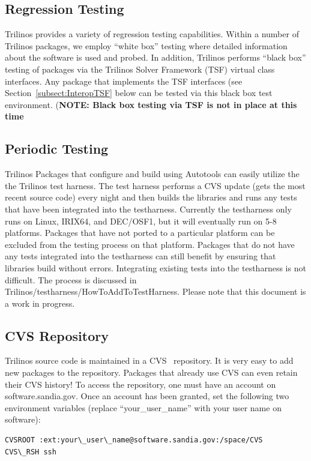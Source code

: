 \documentclass[12pt,relax]{TrilinosDevGuide}
\begin{document}
\subsection{Regression Testing}
Trilinos provides a variety of regression
testing capabilities.  Within a number of Trilinos packages, we employ
``white box'' testing where detailed information about the software is
used and probed.  In addition, Trilinos performs ``black box'' testing
of packages via the Trilinos Solver Framework (TSF) virtual class
interfaces.  Any package that implements the TSF interfaces (see
Section~\ref{subsect:InteropTSF} below 
can be tested via this black box
test environment.  ({\bf NOTE: Black box testing via TSF is not in
place at this time}
	\subsection{Periodic Testing}
Trilinos Packages that configure and build using Autotools can easily 
utilize the the Trilinos test harness.  The test harness performs a CVS update
(gets the most recent source code) every night and then builds the libraries
and runs any tests that have been integrated into the testharness.  
Currently the testharness only runs on Linux, IRIX64, and DEC/OSF1, but it 
will eventually run on 5-8 platforms.  Packages that have not ported to a 
particular platform can be excluded from the testing process on that 
platform.  Packages that do not have any tests integrated into the 
testharness can still benefit by ensuring that libraries build without 
errors.  Integrating existing tests into the testharness is not difficult.  
The process is discussed in Trilinos/testharness/HowToAddToTestHarness.  
Please note that this document is a work in progress.

\subsection{CVS Repository}
Trilinos source code is maintained in a CVS~\cite{CVS} repository.  It is 
very easy to add new packages to the repository.  Packages that already use 
CVS can even retain their CVS history!  To access the repository, one must 
have an account on software.sandia.gov.  Once an account has been granted, 
set the following two environment variables (replace ``your\_user\_name'' 
with your user name on software):

\begin{verbatim}
CVSROOT :ext:your\_user\_name@software.sandia.gov:/space/CVS
CVS\_RSH ssh
\end{verbatim}
\end{document}
